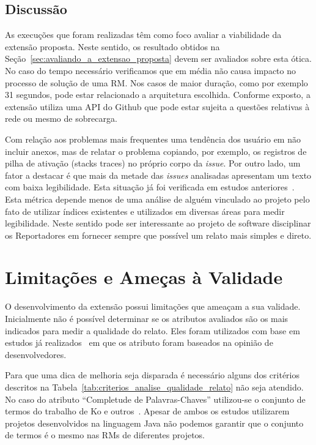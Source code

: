 \subsection{Discussão}
\label{sub:implemtacao_extensao_avaliacao_discussao}

As execuções que foram realizadas têm como foco avaliar a viabilidade da
extensão proposta. Neste sentido, os resultado obtidos na
Seção~\ref{sec:avaliando_a_extensao_proposta} devem ser avaliados sobre esta
ótica. No caso do tempo necessário verificamos que em média não causa impacto no
processo de solução de uma RM\@. Nos casos de maior duração, como por exemplo 31
segundos, pode estar relacionado a arquitetura escolhida. Conforme exposto, a
extensão utiliza uma API do Github que pode estar sujeita a questões relativas à
rede ou mesmo de sobrecarga.

Com relação aos problemas mais frequentes uma tendência dos usuário em não
incluir anexos, mas de relatar o problema copiando, por exemplo, os registros de
pilha de ativação (stacks traces) no próprio corpo da \textit{issue}. Por outro
lado, um fator a destacar é que mais da metade das \textit{issues} analisadas
apresentam um texto com baixa legibilidade. Esta situação já foi verificada em
estudos anteriores~\cite{ko2006linguistic, bettenburg2007quality}. Esta métrica
depende menos de uma análise de alguém vinculado ao projeto pelo fato de
utilizar índices existentes e utilizados em diversas áreas para medir
legibilidade. Neste sentido pode ser interessante ao projeto de software
disciplinar os Reportadores em fornecer sempre que possível um relato mais
simples e direto.

\section{Limitações e Ameças à Validade}
\label{sec:limitações_e_ameças_à_validade}

O desenvolvimento da extensão possui limitações que ameaçam a sua validade.
Inicialmente não é possível determinar se os atributos avaliados são os mais
indicados para medir a qualidade do relato. Eles foram utilizados com base em
estudos já realizados~\cite{bettenburg2007quality} em que os atributo foram
baseados na opinião de desenvolvedores.

Para que uma dica de melhoria seja disparada é necessário alguns dos critérios
descritos na Tabela~\ref{tab:criterios_analise_qualidade_relato} não seja
atendido. No caso do atributo ``Completude de Palavras-Chaves'' utilizou-se o
conjunto de termos do trabalho de Ko e outros~\cite{ko2006linguistic}. Apesar de
ambos os estudos utilizarem projetos desenvolvidos na linguagem Java não podemos
garantir que o conjunto de termos é o mesmo nas RMs de diferentes projetos.

